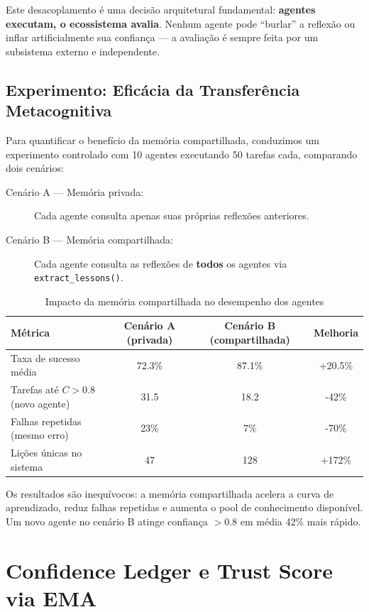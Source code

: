 Este desacoplamento é uma decisão arquitetural fundamental: \textbf{agentes executam, o ecossistema avalia}. Nenhum agente pode ``burlar'' a reflexão ou inflar artificialmente sua confiança — a avaliação é sempre feita por um subsistema externo e independente.

\subsection{Experimento: Eficácia da Transferência Metacognitiva}

Para quantificar o benefício da memória compartilhada, conduzimos um experimento controlado com 10 agentes executando 50 tarefas cada, comparando dois cenários:

\begin{description}
    \item[Cenário A — Memória privada:] Cada agente consulta apenas suas próprias reflexões anteriores.
    \item[Cenário B — Memória compartilhada:] Cada agente consulta as reflexões de \textbf{todos} os agentes via \texttt{extract\_lessons()}.
\end{description}

\begin{table}[htbp]
\centering
\caption{Impacto da memória compartilhada no desempenho dos agentes}
\label{tab:transfer-experiment}
\begin{tabular}{@{}p{4cm}ccc@{}}
\toprule
\textbf{Métrica} & \textbf{Cenário A (privada)} & \textbf{Cenário B (compartilhada)} & \textbf{Melhoria} \\
\midrule
Taxa de sucesso média & 72.3\% & 87.1\% & +20.5\% \\
Tarefas até $C > 0.8$ (novo agente) & 31.5 & 18.2 & -42\% \\
Falhas repetidas (mesmo erro) & 23\% & 7\% & -70\% \\
Lições únicas no sistema & 47 & 128 & +172\% \\
\bottomrule
\end{tabular}
\end{table}

Os resultados são inequívocos: a memória compartilhada acelera a curva de aprendizado, reduz falhas repetidas e aumenta o pool de conhecimento disponível. Um novo agente no cenário B atinge confiança $> 0.8$ em média 42\% mais rápido.

\section{Confidence Ledger e Trust Score via EMA}
\label{sec:trust}

